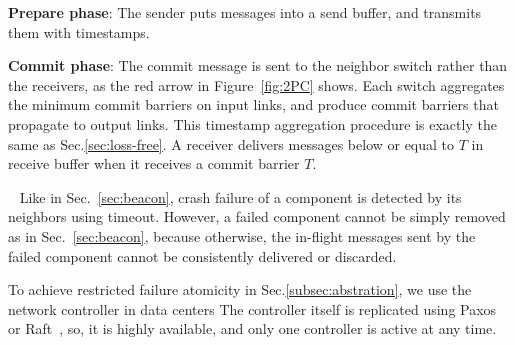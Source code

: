 \begin{ecompact}
\item \textbf{Prepare phase}: The sender puts messages into a send buffer, and transmits them with timestamps. 
\item \textbf{Commit phase}:  The commit message is sent to the neighbor switch rather than the receivers, as the red arrow in Figure~\ref{fig:2PC} shows. Each switch aggregates the minimum commit barriers on input links, and produce commit barriers that propagate to output links. This timestamp aggregation procedure is exactly the same as Sec.\ref{sec:loss-free}. A receiver delivers messages below or equal to $T$ in receive buffer when it receives a commit barrier $T$.~
\end{ecompact}



~
Like in Sec.~\ref{sec:beacon}, crash failure of a component is detected by its neighbors using timeout.
However, a failed component cannot be simply removed as in Sec.~\ref{sec:beacon}, because otherwise, the in-flight messages sent by the failed component cannot be consistently delivered or discarded.

To achieve restricted failure atomicity in Sec.\ref{subsec:abstration}, we use the network controller in data centers 
The controller itself is replicated using Paxos~\cite{lamport1998part} or Raft~\cite{raft}, so, it is highly available, and only one controller is active at any time.


